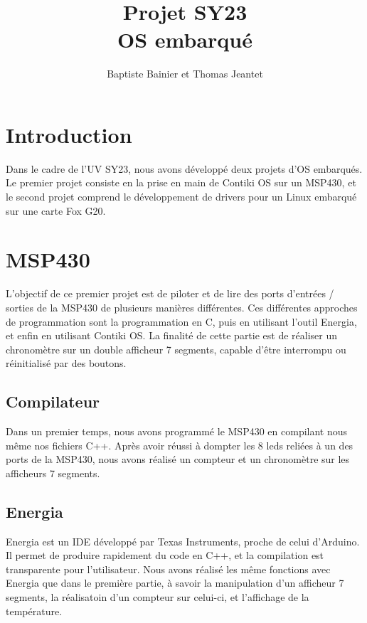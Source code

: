 \documentclass[a4paper,12pt]{article}
\author{Baptiste Bainier et Thomas Jeantet}
\title{Projet SY23\\OS embarqué}
\begin{document}
\maketitle
\newpage
\newpage


\section*{Introduction}

Dans le cadre de l'UV SY23, nous avons développé deux projets d'OS embarqués. Le premier projet consiste en la prise en main de Contiki OS sur un MSP430, et le second projet comprend le développement de drivers pour un Linux embarqué sur une carte Fox G20.

\bigskip
\bigskip
\bigskip
\tableofcontents

\newpage
\section{MSP430}
  L'objectif de ce premier projet est de piloter et de lire des ports d'entrées / sorties de la MSP430 de plusieurs manières différentes. Ces différentes approches de programmation sont la programmation en C, puis en utilisant l'outil Energia, et enfin en utilisant Contiki OS. La finalité de cette partie est de réaliser un chronomètre sur un double afficheur 7 segments, capable d'être interrompu ou réinitialisé par des boutons.

\bigskip
  \subsection{Compilateur}
  	Dans un premier temps, nous avons programmé le MSP430 en compilant nous même nos fichiers C++. Après avoir réussi à dompter les 8 leds reliées à un des ports de la MSP430, nous avons réalisé un compteur et un chronomètre sur les afficheurs 7 segments.

\bigskip
  \subsection{Energia}
  	Energia est un IDE développé par Texas Instruments, proche de celui d'Arduino. Il permet de produire rapidement du code en C++, et la compilation est transparente pour l'utilisateur. Nous avons réalisé les même fonctions avec Energia que dans le première partie, à savoir la manipulation d'un afficheur 7 segments, la réalisatoin d'un compteur sur celui-ci, et l'affichage de la température.
\end{document}
